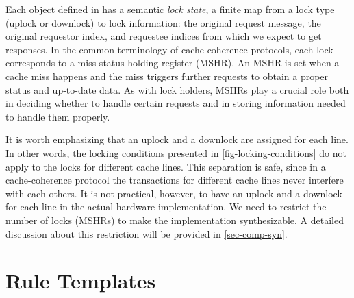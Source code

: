 Each object defined in \hemiola{} has a semantic \emph{lock state}, a finite map from a lock type (uplock or downlock) to lock information: the original request message, the original requestor index, and requestee indices from which we expect to get responses.
In the common terminology of cache-coherence protocols, each lock corresponds to a miss status holding register (MSHR).
An MSHR is set when a cache miss happens and the miss triggers further requests to obtain a proper status and up-to-date data.
As with \hemiola{} lock holders, MSHRs play a crucial role both in deciding whether to handle certain requests and in storing information needed to handle them properly.

It is worth emphasizing that an uplock and a downlock are assigned for each line.
In other words, the locking conditions presented in \autoref{fig-locking-conditions} do not apply to the locks for different cache lines.
This separation is safe, since in a cache-coherence protocol the transactions for different cache lines never interfere with each others.
It is not practical, however, to have an uplock and a downlock for each line in the actual hardware implementation.
We need to restrict the number of locks (MSHRs) to make the implementation synthesizable.
A detailed discussion about this restriction will be provided in \autoref{sec-comp-syn}.

\section{Rule Templates}
\label{sec-rule-templates}

\newcommand{\rtname}[1]{{\small\sf\bf #1}}

\newcommand{\uled}{\ensuremath{\textsf{UL}}}
\newcommand{\dled}{\ensuremath{\textsf{DL}}}
\newcommand{\ulfree}{\ensuremath{\textsf{UL}_{\times}}}
\newcommand{\dlfree}{\ensuremath{\textsf{DL}_{\times}}}

\newcommand{\setul}{\ensuremath{\textsf{UL}\Uparrow}}
\newcommand{\setdl}{\ensuremath{\textsf{DL}\Uparrow}}
\newcommand{\relul}{\ensuremath{\textsf{UL}\Downarrow}}
\newcommand{\reldl}{\ensuremath{\textsf{DL}\Downarrow}}
\newcommand{\stsilent}{\ensuremath{\textsf{SLT}}}

\newcommand{\ppo}[3]{\ensuremath{\{#1\}#2\lbrack#3\rbrack}}
\newcommand*{\bfrac}[2]{\genfrac{}{}{0pt}{}{#1}{#2}}

